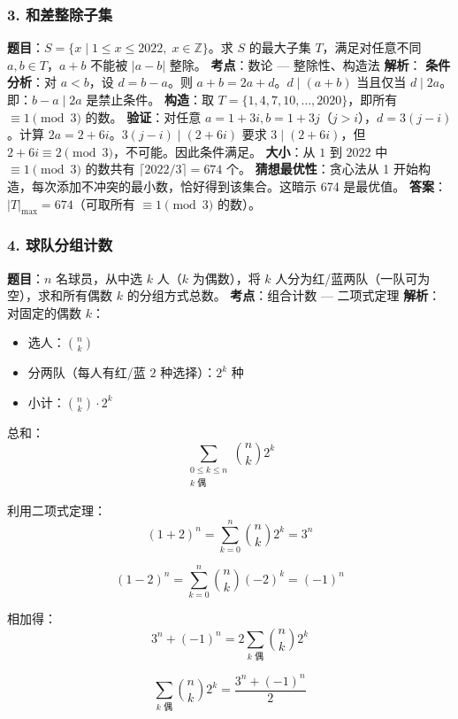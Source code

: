 \documentclass[10pt,a4paper,openany]{ctexbook}
\theoremstyle{definition}
\theoremstyle{remark}
\begin{document}
\subsubsection{3. 和差整除子集}

\textbf{题目}：$S = \{x \mid 1 \le x \le 2022,\; x \in \mathbb{Z}\}$。求 $S$ 的最大子集 $T$，满足对任意不同 $a, b \in T$，$a+b$ 不能被 $|a-b|$ 整除。
\textbf{考点}：数论 — 整除性、构造法
\textbf{解析}：
\textbf{条件分析}：对 $a < b$，设 $d = b-a$。则 $a+b = 2a + d$。$d \mid (a+b)$ 当且仅当 $d \mid 2a$。
即：$b-a \mid 2a$ 是禁止条件。
\textbf{构造}：取 $T = \{1, 4, 7, 10, \dots, 2020\}$，即所有 $\equiv 1 \pmod{3}$ 的数。
\textbf{验证}：对任意 $a = 1+3i, b = 1+3j$（$j > i$），$d = 3(j-i)$。计算 $2a = 2 + 6i$。$3(j-i) \mid (2+6i)$ 要求 $3 \mid (2+6i)$，但 $2+6i \equiv 2 \pmod{3}$，不可能。因此条件满足。
\textbf{大小}：从 $1$ 到 $2022$ 中 $\equiv 1 \pmod{3}$ 的数共有 $\lceil 2022/3 \rceil = 674$ 个。
\textbf{猜想最优性}：贪心法从 1 开始构造，每次添加不冲突的最小数，恰好得到该集合。这暗示 674 是最优值。
\textbf{答案}：$|T|_{\max} = \boxed{674}$（可取所有 $\equiv 1 \pmod{3}$ 的数）。
\vspace{-2pt}

\subsubsection{4. 球队分组计数}

\textbf{题目}：$n$ 名球员，从中选 $k$ 人（$k$ 为偶数），将 $k$ 人分为红/蓝两队（一队可为空），求和所有偶数 $k$ 的分组方式总数。
\textbf{考点}：组合计数 — 二项式定理
\textbf{解析}：
对固定的偶数 $k$：
\begin{itemize}
\item 选人：$\binom{n}{k}$
\item 分两队（每人有红/蓝 $2$ 种选择）：$2^k$ 种
\item 小计：$\binom{n}{k} \cdot 2^k$

\end{itemize}

总和：
\[
 \sum_{\substack{0 \le k \le n \\ k \text{ 偶}}} \binom{n}{k} 2^k 
\]

利用二项式定理：
\[
 (1+2)^n = \sum_{k=0}^n \binom{n}{k} 2^k = 3^n 
\]

\[
 (1-2)^n = \sum_{k=0}^n \binom{n}{k} (-2)^k = (-1)^n 
\]

相加得：
\[
 3^n + (-1)^n = 2 \sum_{k \text{ 偶}} \binom{n}{k} 2^k 
\]

\[
 \sum_{k \text{ 偶}} \binom{n}{k} 2^k = \frac{3^n + (-1)^n}{2} 
\]
\end{document}
